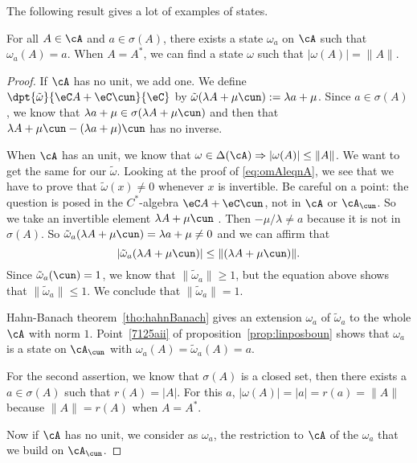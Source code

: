 The following result gives a lot of examples of states.

\begin{lemma}
	For all $A\in \cA$ and $a\in\sigma(A)$, there exists a state $\omega_a$ on $\cA$ such that $\omega_a(A)=a$. When $A=A^*$, we can find a state $\omega$ such that $| \omega(A) |=\| A \|$. \label{lem:omAenomA}
\end{lemma}

\begin{proof}
	If $\cA$ has no unit, we add one. We define $\dpt{\tilde\omega}{\eC A+\eC\cun}{\eC}$ by $\tilde\omega(\lambda A+\mu\cun):=\lambda a+\mu$. Since $a\in\sigma(A)$, we know that $\lambda a+\mu\in\sigma(\lambda A+\mu\cun)$ and then that $\lambda A+\mu\cun-(\lambda  a+\mu)\cun$ has no inverse.

	When $\cA$ has an unit, we know that $\omega\in\Delta(\cA)\Rightarrow | \omega(A) |\leq \| A \|$. We want to get the same for our $\tilde\omega$. Looking at the proof of \eqref{eq:omAleqnA}, we see that we have to prove that $\tilde\omega(x)\neq 0$ whenever $x$ is invertible. Be careful on a point: the question is posed in the $C^*$-algebra $\eC A+\eC\cun$, not in $\cA$ or $\cA_{\cun}$. So we take an invertible element $\lambda A+\mu\cun$ . Then $-\mu/\lambda\neq a$ because it is not in $\sigma(A)$. So $\tilde\omega_a(\lambda A+\mu\cun)=\lambda a+\mu\neq 0$ and we can affirm that
	\begin{equation}
		| \tilde\omega_a(\lambda A+\mu\cun) |\leq \| (\lambda A+\mu\cun) \|.
	\end{equation}
	Since $\tilde\omega_a(\cun)=1$, we know that $\| \tilde\omega_a \|\geq 1$, but the equation above shows that $\| \tilde\omega_a \|\leq 1$. We conclude that $\| \tilde\omega_a \|=1$.

	Hahn-Banach theorem~\ref{tho:hahnBanach} gives an extension $\omega_a$ of $\tilde\omega_a$ to the whole $\cA$ with norm $1$.
	Point~\ref{7125aii} of proposition~\ref{prop:linposboun} shows that $\omega_a$ is a state on $\cA_{\cun}$ with $\omega_a(A)=\tilde\omega_a(A)=a$.

	For the second assertion, we know that $\sigma(A)$ is a closed set, then there exists a $a\in\sigma(A)$ such that $r(A)=| A |$. For this $a$, $| \omega(A) |=| a |=r(a)=\| A \|$ because $\| A \|=r(A)$ when $A=A^*$.

	Now if $\cA$ has no unit, we consider as $\omega_a$, the restriction to $\cA$ of the $\omega_a$ that we build on $\cA_{\cun}$.

\end{proof}

